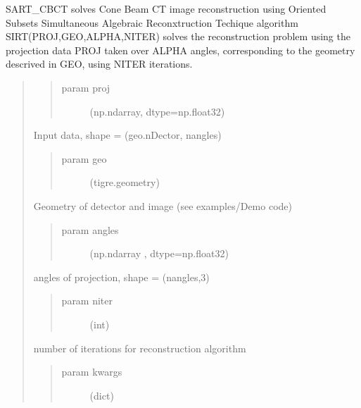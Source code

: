 \documentclass[letterpaper,10pt,english]{sphinxmanual}
\begin{document}
\begin{fulllineitems}
\label{\detokenize{index:tigre.algorithms.sirt}}
SART\_CBCT solves Cone Beam CT image reconstruction using Oriented Subsets
Simultaneous Algebraic Reconxtruction Techique algorithm
SIRT(PROJ,GEO,ALPHA,NITER) solves the reconstruction problem
using the projection data PROJ taken over ALPHA angles, corresponding
to the geometry descrived in GEO, using NITER iterations.
\begin{quote}
\begin{quote}\begin{description}
\item[{param proj}] \leavevmode
(np.ndarray, dtype=np.float32)

\end{description}\end{quote}

Input data, shape = (geo.nDector, nangles)
\begin{quote}\begin{description}
\item[{param geo}] \leavevmode
(tigre.geometry)

\end{description}\end{quote}

Geometry of detector and image (see examples/Demo code)
\begin{quote}\begin{description}
\item[{param angles}] \leavevmode
(np.ndarray , dtype=np.float32)

\end{description}\end{quote}

angles of projection, shape = (nangles,3)
\begin{quote}\begin{description}
\item[{param niter}] \leavevmode
(int)

\end{description}\end{quote}

number of iterations for reconstruction algorithm
\begin{quote}\begin{description}
\item[{param kwargs}] \leavevmode
(dict)


\end{description}
\end{quote}
\end{quote}
\end{fulllineitems}
\end{document}
